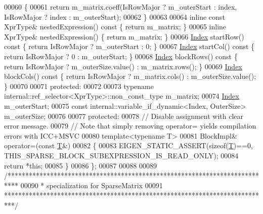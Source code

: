 \begin{DoxyCode}
00060 \textcolor{keyword}{    }\{
00061       \textcolor{keywordflow}{return} m\_matrix.coeff(IsRowMajor ? m\_outerStart : index, IsRowMajor ? index :  m\_outerStart);
00062     \}
00063 
00064     \textcolor{keyword}{inline} \textcolor{keyword}{const} XprType& nestedExpression()\textcolor{keyword}{ const }\{ \textcolor{keywordflow}{return} m\_matrix; \}
00065     \textcolor{keyword}{inline} XprType& nestedExpression() \{ \textcolor{keywordflow}{return} m\_matrix; \}
00066     \hyperlink{namespace_eigen_a62e77e0933482dafde8fe197d9a2cfde}{Index} startRow()\textcolor{keyword}{ const }\{ \textcolor{keywordflow}{return} IsRowMajor ? m\_outerStart : 0; \}
00067     \hyperlink{namespace_eigen_a62e77e0933482dafde8fe197d9a2cfde}{Index} startCol()\textcolor{keyword}{ const }\{ \textcolor{keywordflow}{return} IsRowMajor ? 0 : m\_outerStart; \}
00068     \hyperlink{namespace_eigen_a62e77e0933482dafde8fe197d9a2cfde}{Index} blockRows()\textcolor{keyword}{ const }\{ \textcolor{keywordflow}{return} IsRowMajor ? m\_outerSize.value() : m\_matrix.rows(); \}
00069     \hyperlink{namespace_eigen_a62e77e0933482dafde8fe197d9a2cfde}{Index} blockCols()\textcolor{keyword}{ const }\{ \textcolor{keywordflow}{return} IsRowMajor ? m\_matrix.cols() : m\_outerSize.value(); \}
00070 
00071   \textcolor{keyword}{protected}:
00072 
00073     \textcolor{keyword}{typename} internal::ref\_selector<XprType>::non\_const\_type m\_matrix;
00074     \hyperlink{namespace_eigen_a62e77e0933482dafde8fe197d9a2cfde}{Index} m\_outerStart;
00075     \textcolor{keyword}{const} internal::variable\_if\_dynamic<Index, OuterSize> m\_outerSize;
00076 
00077   \textcolor{keyword}{protected}:
00078     \textcolor{comment}{// Disable assignment with clear error message.}
00079     \textcolor{comment}{// Note that simply removing operator= yields compilation errors with ICC+MSVC}
00080     \textcolor{keyword}{template}<\textcolor{keyword}{typename} T>
00081     BlockImpl& operator=(\textcolor{keyword}{const} \hyperlink{group___sparse_core___module_class_eigen_1_1_triplet}{T}&)
00082     \{
00083       EIGEN\_STATIC\_ASSERT(\textcolor{keyword}{sizeof}(\hyperlink{group___sparse_core___module_class_eigen_1_1_triplet}{T})==0, THIS\_SPARSE\_BLOCK\_SUBEXPRESSION\_IS\_READ\_ONLY);
00084       \textcolor{keywordflow}{return} *\textcolor{keyword}{this};
00085     \}
00086 \};
00087 
00088 
00089 \textcolor{comment}{/***************************************************************************}
00090 \textcolor{comment}{* specialization for SparseMatrix}
00091 \textcolor{comment}{***************************************************************************/}

\end{DoxyCode}

